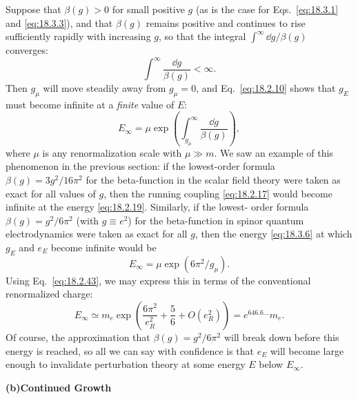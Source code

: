 Suppose that $\beta(g)>0$ for small positive $g$ (as is the case for Eqs.\ \eqref{eq:18.3.1}
and \eqref{eq:18.3.3}), and that $\beta(g)$ remains positive and continues to rise sufficiently
rapidly with increasing $g$, so that the integral $\int^\infty \dd g/\beta(g)$ converges:
\begin{equation}
\int^\infty\frac{\dd g}{\beta(g)}<\infty.
\label{eq:18.3.5}
\end{equation}
Then $g_\mu$ will move steadily away from $g_\mu=0$, and Eq.\ \eqref{eq:18.2.10} shows
that $g_E$ must become infinite at a \emph{finite} value of $E$:
\begin{equation}
E_\infty=\mu\exp\left(\int_{g_\mu}^\infty\frac{\dd g}{\beta(g)}\right),
\label{eq:18.3.6}
\end{equation}
where $\mu$ is any renormalization scale with $\mu\gg m$. We saw an example
of this phenomenon in the previous section: if the lowest-order formula
$\beta(g)=3g^2/16\pi^2$ for the beta-function in the scalar field theory were
taken as exact for all values of $g$, then the running coupling \eqref{eq:18.2.17}
would become infinite at the energy \eqref{eq:18.2.19}. Similarly, if the lowest-
order formula $\beta(g)=g^2/6\pi^2$ (with $g\equiv e^2$) for the beta-function in spinor
quantum electrodynamics were taken as exact for all $g$, then the energy
\eqref{eq:18.3.6} at which $g_E$ and $e_E$ become infinite would be
\begin{equation}
E_\infty=\mu\exp(6\pi^2/g_\mu).
\label{eq:18.3.7}
\end{equation}
Using Eq.\ \eqref{eq:18.2.43}, we may express this in terms of the conventional
renormalized charge:
\begin{equation}
E_\infty\simeq m_e\exp\left(\frac{6\pi^2}{e_R^2}+\frac{5}{6}+O(e_R^2)\right)
=e^{646.6\ldots}m_e.
\label{eq:18.3.8}
\end{equation}
Of course, the approximation that $\beta(g)=g^2/6\pi^2$ will break down before
this energy is reached, so all we can say with confidence is that $e_E$ will
become large enough to invalidate perturbation theory at some energy $E$
below $E_\infty$.

\medskip
\noindent\textbf{(b)\quad Continued Growth}

